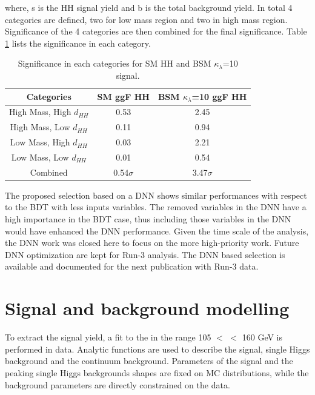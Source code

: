 where, s is the HH signal yield and b is the total background yield. In total 4 categories are defined, two for low mass region and two in high mass region. Significance of the 4 categories are then combined for the final significance. Table \ref{tab:Sig} lists the significance in each category. \\
\begin{table}[htbp]
    \centering
    \begin{tabular}{ccc}
        \hline\hline
        Categories & SM ggF HH & BSM $\kappa_\lambda$=10 ggF HH \\
        \hline
        High Mass, High $d_{HH}$ & 0.53 & 2.45 \\
        High Mass, Low $d_{HH}$ & 0.11 & 0.94 \\
        Low Mass, High $d_{HH}$ & 0.03 & 2.21 \\
        Low Mass, Low $d_{HH}$ & 0.01 & 0.54 \\
        \hline
        Combined & 0.54$\sigma$ & 3.47$\sigma$ \\
        \hline
        \hline
    \end{tabular}
    \begin{tcolorbox}[colback=black!5!white, colframe=white!75!black]
    \caption{Significance in each categories for SM HH and BSM $\kappa_\lambda$=10 signal.}
    \label{tab:Sig}
    \end{tcolorbox}
    
\end{table}
The proposed selection based on a DNN shows similar performances with respect to the BDT with less inputs variables. The removed variables in the DNN have a high importance in the BDT case, thus including those variables in the DNN would have enhanced the DNN performance. Given the time scale of the analysis, the DNN work was closed here to focus on the more high-priority work. Future DNN optimization are kept for Run-3 analysis. The DNN based selection is available and documented for the next publication with Run-3 data. \\

\section{Signal and background modelling}
\label{HHyybb:Modelling}

To extract the \HHyybb signal yield, a fit to the \myy in the range 105 $<$ \myy $<$ 160 GeV is performed in data. Analytic functions are used to describe the signal, single Higgs background and the continuum background. Parameters of the signal and the peaking single Higgs backgrounds shapes are fixed on MC distributions, while the background parameters are directly constrained on the data.   

